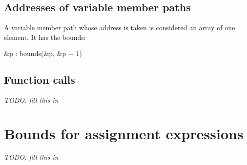 \subsection{Addresses of variable member paths}

A variable member path  whose address is taken is considered an
array of one element. It has the bounds:

\&p : bounds(\&p, \&p + 1)

\subsection{Function calls}

\emph{TODO: fill this in}

\section{Bounds for assignment expressions}

\emph{TODO: fill this in}
